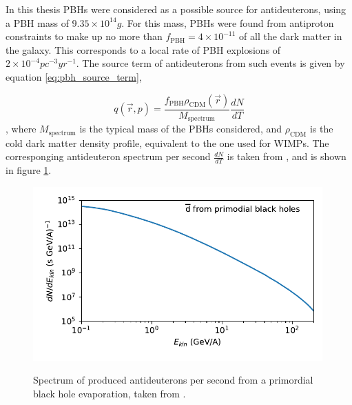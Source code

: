 In this thesis PBHs were considered as a possible source for antideuterons, using a PBH mass of $9.35\times 10^{14}g$. For this mass, PBHs were found from antiproton constraints to make up no more than $f_\mathrm{PBH} = 4\times 10^{-11}$ of all the dark matter in the galaxy. This corresponds to a local rate of PBH explosions of $2\times 10^{-4} pc^{-3}yr^{-1}$. The source term of antideuterons from such events is given by equation \ref{eq:pbh_source_term},

\begin{equation}\label{eq:pbh_source_term}
		q ( \vec{r}, p) = \frac{f_\mathrm{PBH} \rho_{\mathrm{CDM}} (\vec{r})}{M_\mathrm{spectrum}}\frac{dN}{dT}

\end{equation}
, where $M_\mathrm{spectrum}$ is the typical mass of the PBHs considered, and $\rho_\mathrm{CDM}$ is the cold dark matter density profile, equivalent to the one used for WIMPs. The corresponging antideuteron spectrum per second $\frac{dN}{dT}$ is taken from \cite{}, and is shown in figure \ref{fig:pbh_source_spectrum}.

\begin{figure}[hbtp]
		\centering
		\includegraphics[width=0.99\textwidth]{figures/pbh_source_spectrum_dbar.pdf}
		\label{fig:pbh_source_spectrum}
		\caption{Spectrum of produced antideuterons per second from a primordial black hole evaporation, taken from \cite{}.}
\end{figure}



